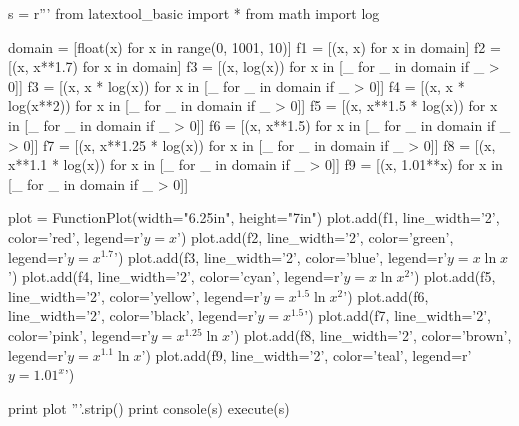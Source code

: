 \newpage
\begin{python}
s = r'''
from latextool_basic import *
from math import log

domain = [float(x) for x in range(0, 1001, 10)]
f1 = [(x, x) for x in domain]
f2 = [(x, x**1.7) for x in domain]
f3 = [(x, log(x)) for x in [_ for _ in domain if _ > 0]]
f3 = [(x, x * log(x)) for x in [_ for _ in domain if _ > 0]]
f4 = [(x, x * log(x**2)) for x in [_ for _ in domain if _ > 0]]
f5 = [(x, x**1.5 * log(x)) for x in [_ for _ in domain if _ > 0]]
f6 = [(x, x**1.5) for x in [_ for _ in domain if _ > 0]]
f7 = [(x, x**1.25 * log(x)) for x in [_ for _ in domain if _ > 0]]
f8 = [(x, x**1.1 * log(x)) for x in [_ for _ in domain if _ > 0]]
f9 = [(x, 1.01**x) for x in [_ for _ in domain if _ > 0]]

plot = FunctionPlot(width="6.25in", height="7in")
plot.add(f1, line_width='2', color='red', legend=r'$y = x$')
plot.add(f2, line_width='2', color='green', legend=r'$y = x^{1.7}$')
plot.add(f3, line_width='2', color='blue', legend=r'$y = x \ln x$')
plot.add(f4, line_width='2', color='cyan', legend=r'$y = x \ln x^2$')
plot.add(f5, line_width='2', color='yellow', legend=r'$y = x^{1.5} \ln x^2$')
plot.add(f6, line_width='2', color='black', legend=r'$y = x^{1.5}$')
plot.add(f7, line_width='2', color='pink', legend=r'$y = x^{1.25} \ln x$')
plot.add(f8, line_width='2', color='brown', legend=r'$y = x^{1.1} \ln x$')
plot.add(f9, line_width='2', color='teal', legend=r'$y = 1.01^x$')

print plot
'''.strip()
print console(s)
execute(s)
\end{python}
